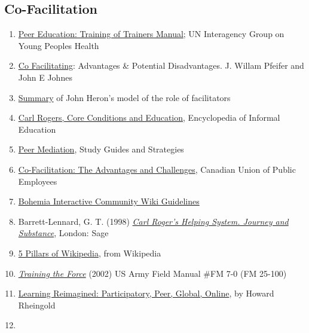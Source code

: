 \subsection{Co-Facilitation}

\begin{enumerate}
\item
  \href{http://www.scribd.com/doc/54544925/51/TRAINING-TOPIC-Co-facilitation-skills}{Peer
  Education: Training of Trainers Manual}; UN Interagency Group on Young
  Peoples Health
\item
  \href{http://www.breakoutofthebox.com/Co-FacilitatingPfeifferJones.pdf}{Co
  Facilitating}: Advantages \& Potential Disadvantages. J. Willam
  Pfeifer and John E Johnes
\item
  \href{http://reviewing.co.uk/archives/art/13\_1\_what\_do\_facilitators\_do.htm\#8\_WAYS\_OF\_FACILITATING\_ACTIVE\_LEARNING}{Summary}
  of John Heron's model of the role of facilitators
\item
  \href{http://www.infed.org/thinkers/et-rogers.htm}{C}\href{http://www.infed.org/thinkers/et-rogers.htm}{arl
  Rogers, Core Conditions and Education}, Encyclopedia of Informal
  Education
\item
  \href{http://www.studygs.net/peermed.htm}{Peer Mediation}, Study
  Guides and Strategies
\item
  \href{http://sk.cupe.ca/updir/cofacilitation-handouts.doc}{Co-Facilitation:
  The Advantages and Challenges}, Canadian Union of Public Employees
\item
  \href{http://community.bistudio.com/wiki/Bohemia\_Interactive\_Community:Guidelines}{Bohemia
  Interactive Community Wiki Guidelines}
\item
  Barrett-Lennard, G. T. (1998)
  \emph{\href{http://openlibrary.org/works/OL2014352W/Carl\_Rogers'\_Helping\_System}{Carl
  Roger's Helping System. Journey and Substance}}, London: Sage
\item
  \href{http://en.wikipedia.org/w/index.php?title=Wikipedia:Five\_pillars\&oldid=501472166}{5
  Pillars of Wikipedia}, from Wikipedia
\item
  \emph{\href{http://www.africom.mil/WO-NCO/DownloadCenter/\%5C40Publications/Training\%20the\%20Force\%20Manual.pdf}{Training
  the Force}} (2002) US Army Field Manual \#FM 7-0 (FM 25-100)
\item
  \href{http://dmlcentral.net/blog/howard-rheingold/learning-reimagined-participatory-peer-global-online}{Learning
  Reimagined: Participatory, Peer, Global, Online}, by Howard Rheingold
\item

\end{enumerate}
